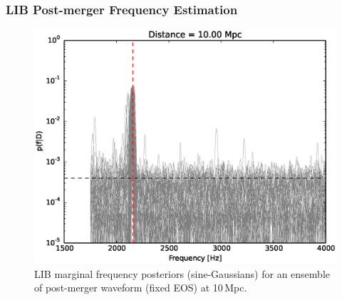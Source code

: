 \documentclass{beamer}
\begin{document}
\begin{frame}
    \frametitle{\textsc{LIB} Post-merger Frequency Estimation}

    \begin{figure}
        \includegraphics[scale=0.35]{freqpdflines_dist-10_00.eps} 
        \caption{\textsc{LIB} marginal frequency posteriors (sine-Gaussians) for
        an ensemble of post-merger waveform (fixed EOS) at 10\,Mpc.}
    \end{figure}

\end{frame}
\end{document}
